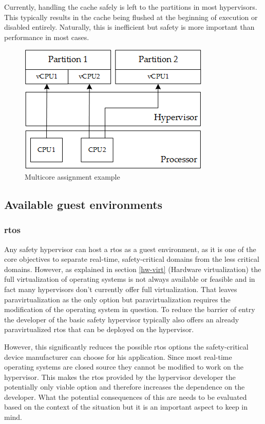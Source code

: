 Currently, handling the cache safely is left to the partitions in most hypervisors. This typically results in the cache being flushed at the beginning of execution or disabled entirely. Naturally, this is inefficient but safety is more important than performance in most cases.

\begin{figure}[hb!]
\centering
\includegraphics[scale=0.75]{Figures/multicore.png}
\decoRule
\caption{Multicore assignment example}
\label{fig:multicore}
\end{figure}

\subsection{Available guest environments}
\subsubsection{\acrshort{rtos}}
Any safety hypervisor can host a \acrlong{rtos} as a guest environment, as it is one of the core objectives to separate real-time, safety-critical domains from the less critical domains. However, as explained in section \ref{hw-virt} (Hardware virtualization) the full virtualization of operating systems is not always available or feasible and in fact many hypervisors don't currently offer full virtualization. That leaves paravirtualization as the only option but paravirtualization requires the modification of the operating system in question. To reduce the barrier of entry the developer of the basic safety hypervisor typically also offers an already paravirtualized \acrshort{rtos} that can be deployed on the hypervisor. 

However, this significantly reduces the possible \acrshort{rtos} options the safety-critical device manufacturer can choose for his application. Since most real-time operating systems are closed source they cannot be modified to work on the hypervisor. This makes the \acrshort{rtos} provided by the hypervisor developer the potentially only viable option and therefore increases the dependence on the developer. What the potential consequences of this are needs to be evaluated based on the context of the situation but it is an important aspect to keep in mind.

